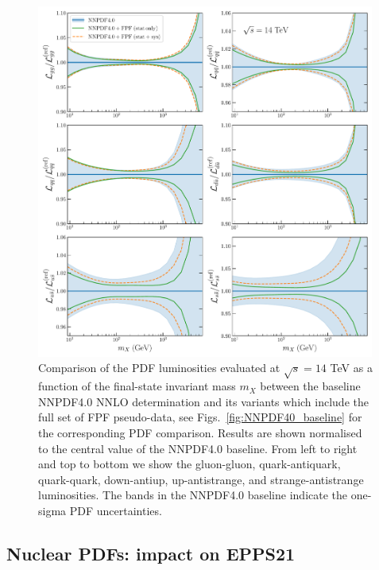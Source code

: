 \begin{figure}[htbp]
\centering
\includegraphics[width=0.99\textwidth]{plots/lumi-FPFall.pdf}
\caption{Comparison of the PDF luminosities evaluated at $\sqrt{s}=14$ TeV
  as a function of the final-state invariant mass $m_X$ between
  the baseline NNPDF4.0 NNLO determination and its variants which include
  the full set of FPF pseudo-data, see Figs.~\ref{fig:NNPDF40_baseline}
  for the corresponding PDF comparison.
  Results are shown normalised to the central value of the NNPDF4.0 baseline.
  From left to right and top to bottom we show the gluon-gluon, quark-antiquark,
  quark-quark, down-antiup, up-antistrange, and strange-antistrange luminosities.
  The bands in the NNPDF4.0 baseline indicate the one-sigma PDF uncertainties.
%
}
\label{fig:nnpdf40_fpf_lumis}
\end{figure}

\subsection{Nuclear PDFs: impact on EPPS21}
\label{sec:nuclearPDFs}

